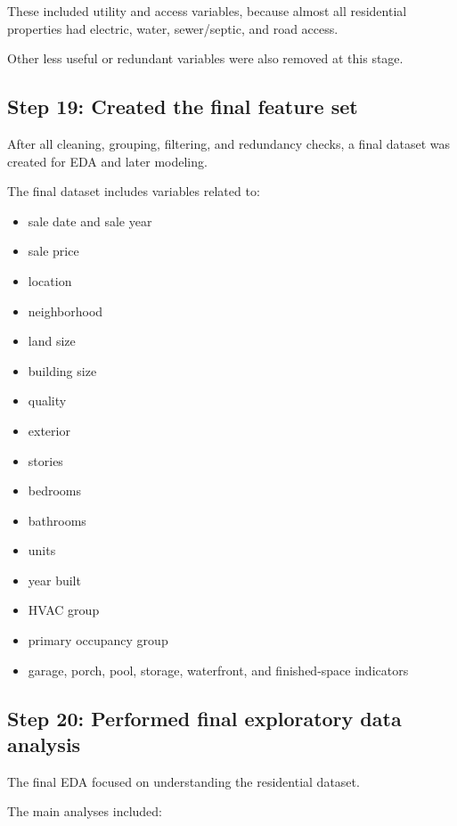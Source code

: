 \documentclass[
  english,
  letterpaper,
  DIV=11,
  numbers=noendperiod]{scrreprt}
\begin{document}
These included utility and access variables, because almost all
residential properties had electric, water, sewer/septic, and road
access.

Other less useful or redundant variables were also removed at this
stage.

\subsection{Step 19: Created the final feature
set}\label{step-19-created-the-final-feature-set}

After all cleaning, grouping, filtering, and redundancy checks, a final
dataset was created for EDA and later modeling.

The final dataset includes variables related to:

\begin{itemize}
\item
  sale date and sale year
\item
  sale price
\item
  location
\item
  neighborhood
\item
  land size
\item
  building size
\item
  quality
\item
  exterior
\item
  stories
\item
  bedrooms
\item
  bathrooms
\item
  units
\item
  year built
\item
  HVAC group
\item
  primary occupancy group
\item
  garage, porch, pool, storage, waterfront, and finished-space
  indicators
\end{itemize}

\subsection{Step 20: Performed final exploratory data
analysis}\label{step-20-performed-final-exploratory-data-analysis}

The final EDA focused on understanding the residential dataset.

The main analyses included:
\end{document}
